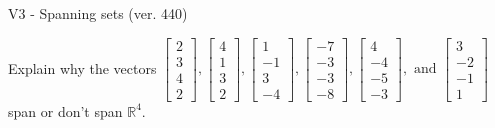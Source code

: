 \begin{exercise}
  \begin{exerciseTitle}V3 - Spanning sets (ver. 440)\end{exerciseTitle}
  \begin{exerciseStatement}
    Explain why the vectors \(\left[\begin{array}{r}
2 \\
3 \\
4 \\
2
\end{array}\right] , \left[\begin{array}{r}
4 \\
1 \\
3 \\
2
\end{array}\right] , \left[\begin{array}{r}
1 \\
-1 \\
3 \\
-4
\end{array}\right] , \left[\begin{array}{r}
-7 \\
-3 \\
-3 \\
-8
\end{array}\right] , \left[\begin{array}{r}
4 \\
-4 \\
-5 \\
-3
\end{array}\right] , \text{ and } \left[\begin{array}{r}
3 \\
-2 \\
-1 \\
1
\end{array}\right]\) span or don't span \(\mathbb{R}^4\). 
	



\end{exerciseStatement}
\end{exercise}
